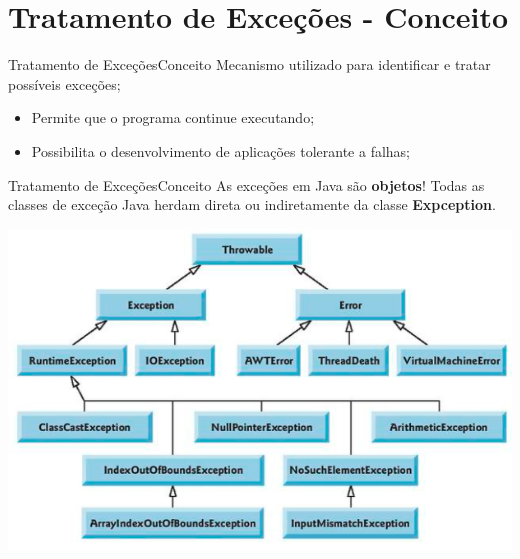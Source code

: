 \documentclass[11pt,aspectratio=43,ignorenonframetext,t]{beamer}
\begin{document}
\section{Tratamento de Exceções - Conceito}
\begin{frame}{Tratamento de Exceções}{Conceito}
    Mecanismo utilizado para identificar e tratar possíveis  exceções;
    \begin{itemize}
        \item Permite que o programa continue executando;
        \item Possibilita o desenvolvimento de aplicações tolerante a falhas;
    \end{itemize}
\end{frame}

\begin{frame}{Tratamento de Exceções}{Conceito}
    As exceções em Java são \textbf{objetos}! Todas as classes de exceção Java herdam direta ou indiretamente da classe \textbf{Expception}.
   \begin{center}
  \includegraphics[height=0.5\paperheight]{fig/aula20/aula20_1.png} \\
 \end{center}
\end{frame}
\end{document}
